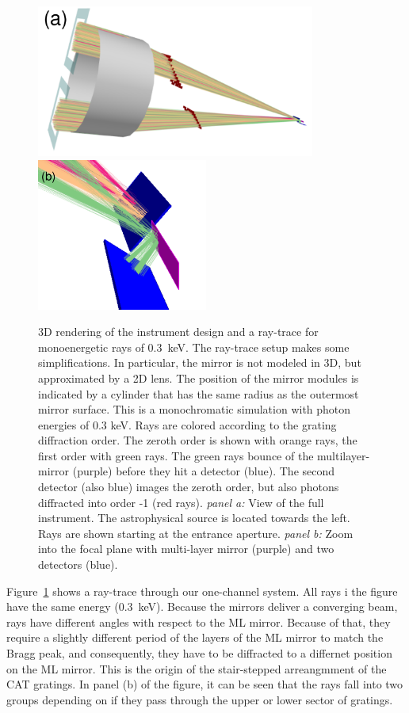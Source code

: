 \documentclass[]{spie}  %
\begin{document}
\begin{figure} [ht]
  \begin{center}
    \includegraphics[height=5cm]{3D.pdf}
    \includegraphics[height=5cm]{3Ddetector.pdf}
  \end{center}
  \caption
      { \label{fig:3d}3D rendering of the instrument design and a
        ray-trace for monoenergetic rays of 0.3~keV. The ray-trace
        setup makes some simplifications. In particular, the mirror is
        not modeled in 3D, but approximated by a 2D lens. The position
        of the mirror modules is indicated by a cylinder that has the
        same radius as the outermost mirror surface. This is a
        monochromatic simulation with photon energies of 0.3 keV. Rays
        are colored according to the grating diffraction order. The
        zeroth order is shown with orange rays, the first order with
        green rays. The green rays bounce of the multilayer-mirror
        (purple) before they hit a detector (blue). The second
        detector (also blue) images the zeroth order, but also photons
        diffracted into order -1 (red rays). \emph{panel a:} View of
        the full instrument. The astrophysical source is located
        towards the left. Rays are shown starting at the entrance
        aperture. \emph{panel b:} Zoom into the focal plane with
        multi-layer mirror (purple) and two detectors (blue).  }
\end{figure}

Figure~\ref{fig:3d} shows a ray-trace through our one-channel
system. All rays i the figure have the same energy (0.3~keV). Because
the mirrors deliver a converging beam, rays have different angles with
respect to the ML mirror. Because of that, they require a slightly
different period of the layers of the ML mirror to match the Bragg
peak, and consequently, they have to be diffracted to a differnet
position on the ML mirror. This is the origin of the stair-stepped
arreangmment of the CAT gratings\cite{redsox,redsoxtrace}. In panel
(b) of the figure, it can be seen that the rays fall into two groups
depending on if they pass through the upper or lower sector of
gratings.
\end{document}
